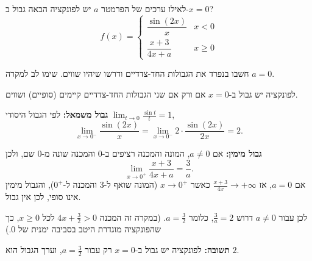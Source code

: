 
\begin{question}
לאילו ערכים של הפרמטר $a$ יש לפונקציה הבאה גבול ב-$x=0$?
\[ f(x)=\begin{cases} \dfrac{\sin(2x)}{x} & x<0 \\[2mm] \dfrac{x+3}{4x+a} & x\ge 0 \end{cases} \]
\end{question}

\begin{hint}
חשבו בנפרד את הגבולות החד-צדדיים ודרשו שיהיו שווים. שימו לב למקרה $a=0$.
\end{hint}

\begin{solution}
לפונקציה יש גבול ב-$x=0$ אם ורק אם שני הגבולות החד-צדדיים קיימים (סופיים) ושווים.

\textbf{גבול משמאל:} לפי הגבול היסודי $\lim_{t\to 0}\frac{\sin t}{t}=1$,
\[ \lim_{x\to 0^-}\frac{\sin(2x)}{x}=\lim_{x\to 0^-}2\cdot\frac{\sin(2x)}{2x}=2. \]

\textbf{גבול מימין:} אם $a\neq 0$, המונה והמכנה רציפים ב-$0$ והמכנה שונה מ-$0$ שם, ולכן
\[ \lim_{x\to 0^+}\frac{x+3}{4x+a}=\frac{3}{a}. \]
אם $a=0$, אז $\frac{x+3}{4x}\to +\infty$ כאשר $x\to 0^+$ (המונה שואף ל-$3$ והמכנה ל-$0^+$), והגבול מימין אינו סופי, לכן אין גבול.

לכן עבור $a\ne 0$ דרוש $\frac{3}{a}=2$, כלומר $a=\frac32$. (במקרה זה המכנה $4x+\frac32>0$ לכל $x\ge 0$, כך שהפונקציה מוגדרת היטב בסביבה ימנית של $0$.)

\textbf{תשובה:} לפונקציה יש גבול ב-$x=0$ רק עבור $a=\frac{3}{2}$, וערך הגבול הוא $2$.
\end{solution}
